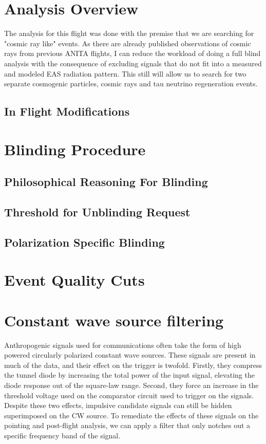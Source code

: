 \section{Analysis Overview}
	The analysis for this flight was done with the premise that we are searching for "cosmic ray like" events.  As there are already published observations of cosmic rays from previous ANITA flights, I can reduce the workload of doing a full blind analysis with the consequence of excluding signals that do not fit into a measured and modeled EAS radiation pattern.  This still will allow us to search for two separate cosmogenic particles, cosmic rays and tau neutrino regeneration events.

	\subsection{In Flight Modifications}
		
	
\section{Blinding Procedure}

	\subsection{Philosophical Reasoning For Blinding}
	
	\subsection{Threshold for Unblinding Request}

	\subsection{Polarization Specific Blinding}

\section{Event Quality Cuts}

\section{Constant wave source filtering}
	Anthropogenic signals used for communications often take the form of high powered circularly polarized constant wave sources.  These signals are present in much of the data, and their effect on the trigger is twofold.  Firstly, they compress the tunnel diode by increasing the total power of the input signal, elevating the diode response out of the square-law range.  Second, they force an increase in the threshold voltage used on the comparator circuit used to trigger on the signals.  Despite these two effects, impulsive candidate signals can still be hidden superimposed on the CW source.  To remediate the effects of these signals on the pointing and post-flight analysis, we can apply a filter that only notches out a specific frequency band of the signal.
